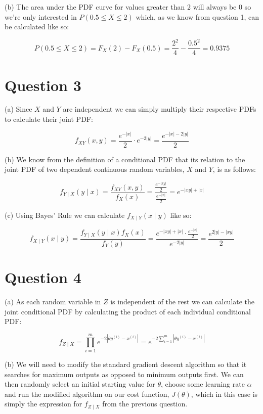 \documentclass[12pt]{article}
\begin{document}
\noindent (b) The area under the PDF curve for values greater than 2 will always be 0 so we're only interested in $P(0.5 \le X \le 2)$ which, as we know from question 1, can be calculated like so:

$$P(0.5 \le X \le 2) = F_X(2) - F_X(0.5) = \frac{2^2}{4} - \frac{0.5^2}{4} = 0.9375$$

\section*{Question 3}

\noindent (a) Since $X$ and $Y$ are independent we can simply multiply their respective PDFs to calculate their joint PDF:

$$f_{XY}(x,y) = \frac{e^{-|x|}}{2} \cdot e^{-2|y|} = \frac{e^{-|x| - 2|y|}}{2}$$

\noindent (b) We know from the definition of a conditional PDF that its relation to the joint PDF of two dependent continuous random variables, $X$ and $Y$, is as follows:

$$f_{Y \mid X}(y \mid x) = \frac{f_{XY}(x,y)}{f_X(x)} = \frac{\frac{e^{-|xy|}}{2}}{\frac{e^{-|x|}}{2}} = e^{-|xy| + |x|}$$

\noindent (c) Using Bayes' Rule we can calculate $f_{X \mid Y}(x \mid y)$ like so:

$$
f_{X \mid Y}(x \mid y) = \frac{f_{Y \mid X}(y \mid x) f_{X}(x)}{f_{Y}(y)} = \frac{e^{-|xy| + |x|} \cdot \frac{e^{-|x|}}{2}}{e^{-2|y|}} = \frac{e^{2|y| - |xy|}}{2}
$$

\section*{Question 4}

\noindent (a) As each random variable in $Z$ is independent of the rest we can calculate the joint conditional PDF by calculating the product of each individual conditional PDF:

$$
f_{Z \mid X} = \prod_{i = 1}^{m} e^{-2|\theta y^{(i)}- x^{(i)}|} = e^{-2 \sum_{i = 1}^{m} |\theta y^{(i)} - x^{(i)}|}
$$

\noindent (b) We will need to modify the standard gradient descent algorithm so that it searches for maximum outputs as opposed to minimum outputs first. We can then randomly select an initial starting value for $\theta$, choose some learning rate $\alpha$ and run the modified algorithm on our cost function, $J(\theta)$, which in this case is simply the expression for $f_{Z \mid X}$ from the previous question.
\end{document}
